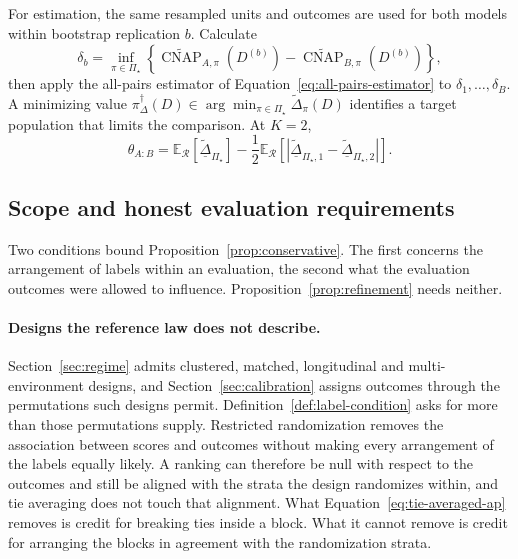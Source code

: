 \documentclass[11pt]{article}
\newcommand{\CNAP}{\operatorname{CNAP}}
\newcommand{\Regime}{\mathcal{R}}
\newcommand{\PSet}{\Pi_\star}
\newcommand{\E}{\mathbb{E}}
\newcommand{\CNAPta}{\widetilde{\CNAP}}
\newcommand{\Dta}{\widetilde{\Delta}}
\newcommand{\RobDta}{\underline{\widetilde{\Delta}}_{\PSet}}
\theoremstyle{remark}
\begin{document}
For estimation, the same resampled units and outcomes are used for both models within bootstrap replication $b$. Calculate
\[
\delta_b
=
\inf_{\pi\in\PSet}
\left\{
\CNAPta_{A,\pi}(D^{(b)})
-
\CNAPta_{B,\pi}(D^{(b)})
\right\},
\]
then apply the all-pairs estimator of Equation~\eqref{eq:all-pairs-estimator} to $\delta_1,\ldots,\delta_B$. A minimizing value $\pi_\Delta^\dagger(D)\in\arg\min_{\pi\in\PSet}\Dta_\pi(D)$ identifies a target population that limits the comparison. At $K=2$,
\begin{equation}
\theta_{A:B}
=
\E_{\Regime}[\RobDta]
-
\frac12
\E_{\Regime}
\left[
|\underline{\widetilde{\Delta}}_{\PSet,1}-\underline{\widetilde{\Delta}}_{\PSet,2}|
\right].
\label{eq:robust-paired-k2}
\end{equation}

\subsection{Scope and honest evaluation requirements}
\label{sec:paired-scope}

Two conditions bound Proposition~\ref{prop:conservative}. The first concerns the arrangement of labels within an evaluation, the second what the evaluation outcomes were allowed to influence. Proposition~\ref{prop:refinement} needs neither.

\paragraph{Designs the reference law does not describe.}
Section~\ref{sec:regime} admits clustered, matched, longitudinal and multi-environment designs, and Section~\ref{sec:calibration} assigns outcomes through the permutations such designs permit. Definition~\ref{def:label-condition} asks for more than those permutations supply. Restricted randomization removes the association between scores and outcomes without making every arrangement of the labels equally likely. A ranking can therefore be null with respect to the outcomes and still be aligned with the strata the design randomizes within, and tie averaging does not touch that alignment. What Equation~\eqref{eq:tie-averaged-ap} removes is credit for breaking ties inside a block. What it cannot remove is credit for arranging the blocks in agreement with the randomization strata.
\end{document}
